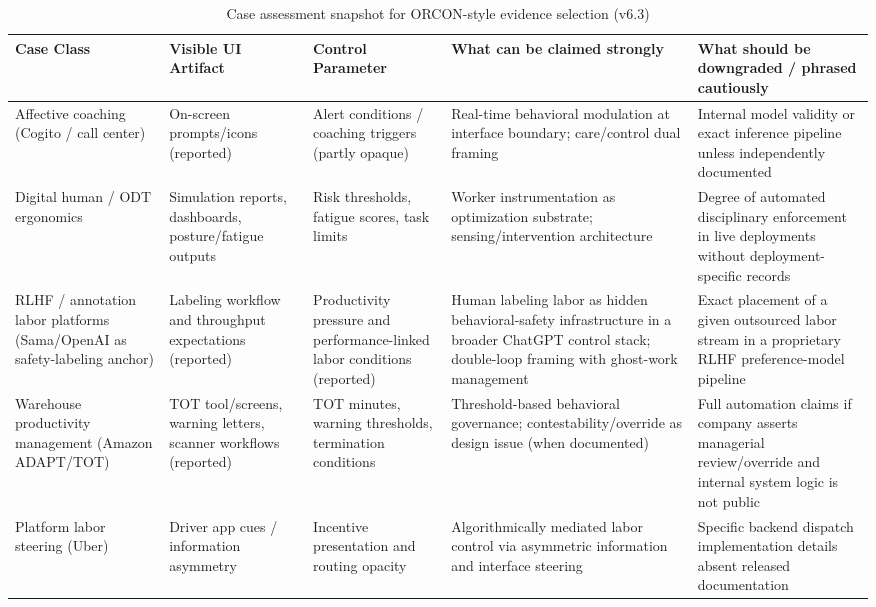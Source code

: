 \documentclass[runningheads]{llncs}
\begin{document}
\begin{table}
\caption{Case assessment snapshot for ORCON-style evidence selection (v6.3)}\label{tab:case-assessment}
\centering
\small
\begin{tabular}{|p{2.4cm}|p{2.8cm}|p{2.3cm}|p{3.1cm}|p{3.1cm}|}
\hline
\textbf{Case Class} & \textbf{Visible UI Artifact} & \textbf{Control Parameter} & \textbf{What can be claimed strongly} & \textbf{What should be downgraded / phrased cautiously} \\
\hline
Affective coaching (Cogito / call center) & On-screen prompts/icons (reported) & Alert conditions / coaching triggers (partly opaque) & Real-time behavioral modulation at interface boundary; care/control dual framing \cite{delagarza2019time,cogito2023businesswire} & Internal model validity or exact inference pipeline unless independently documented \\
\hline
Digital human / ODT ergonomics & Simulation reports, dashboards, posture/fatigue outputs & Risk thresholds, fatigue scores, task limits & Worker instrumentation as optimization substrate; sensing/intervention architecture \cite{siemensPSXHuman,siemensHumanAdvanced} & Degree of automated disciplinary enforcement in live deployments without deployment-specific records \\
\hline
RLHF / annotation labor platforms (Sama/OpenAI as safety-labeling anchor) & Labeling workflow and throughput expectations (reported) & Productivity pressure and performance-linked labor conditions (reported) & Human labeling labor as hidden behavioral-safety infrastructure in a broader ChatGPT control stack; double-loop framing with ghost-work management \cite{perrigo2023time,gray2019ghost,kellogg2020algorithms} & Exact placement of a given outsourced labor stream in a proprietary RLHF preference-model pipeline \\
\hline
Warehouse productivity management (Amazon ADAPT/TOT) & TOT tool/screens, warning letters, scanner workflows (reported) & TOT minutes, warning thresholds, termination conditions & Threshold-based behavioral governance; contestability/override as design issue (when documented) \cite{gurley2022vice} & Full automation claims if company asserts managerial review/override and internal system logic is not public \\
\hline
Platform labor steering (Uber) & Driver app cues / information asymmetry & Incentive presentation and routing opacity & Algorithmically mediated labor control via asymmetric information and interface steering \cite{rosenblat2016uber} & Specific backend dispatch implementation details absent released documentation \\
\hline
\end{tabular}
\end{table}
\end{document}
